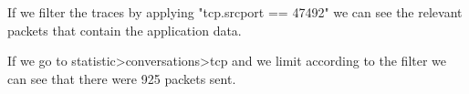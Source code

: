 If we filter the traces by applying "tcp.srcport == 47492" we can see the relevant packets that contain the application data.

If we go to statistic>conversations>tcp and we limit according to the filter we can see that there were 925 packets sent. 